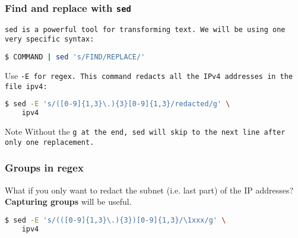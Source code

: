 \begin{frame}[fragile]
\frametitle{Find and replace with \tt{sed}}
\tt{sed} is a powerful tool for transforming text.
We will be using one very specific syntax:
\begin{lstlisting}[language=bash]
$ COMMAND | sed 's/FIND/REPLACE/'
\end{lstlisting}
Use \tt{-E} for regex. This command redacts all the IPv4 addresses in the
file \tt{ipv4}:
\begin{lstlisting}[language=bash]
$ sed -E 's/([0-9]{1,3}\.){3}[0-9]{1,3}/redacted/g' \
    ipv4
\end{lstlisting}
\begin{block}{Note}
    Without the \tt{g} at the end, \tt{sed} will skip to the
    next line after only one replacement.
\end{block}
\end{frame}

\begin{frame}[fragile]
\frametitle{Groups in regex}
What if you only want to redact the subnet (i.e. last part) of the IP addresses?
\textbf{Capturing groups} will be useful.
\begin{lstlisting}[language=bash]
$ sed -E 's/(([0-9]{1,3}\.){3})[0-9]{1,3}/\1xxx/g' \
    ipv4
\end{lstlisting}
\end{frame}
